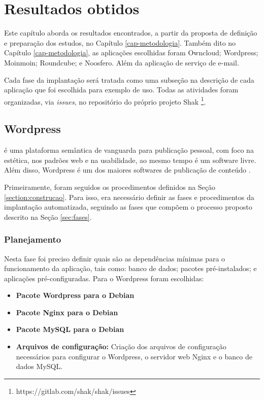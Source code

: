 \chapter{Resultados obtidos}
\label{cap-resultados}
Este capítulo aborda os resultados encontrados, a partir da proposta de
definição e preparação dos estudos, no Capítulo \ref{cap-metodologia}. Também dito 
no Capítulo \ref{cap-metodologia}, as aplicações escolhidas foram  
Owncloud; Wordpress; Moinmoin; Roundcube; e Noosfero. Além da aplicação de serviço
de e-mail.
 
Cada fase da implantação será tratada como uma 
subseção na descrição de cada aplicação que foi escolhida para exemplo de uso. 
Todas as atividades foram organizadas,
via \textit{issues}, no repositório do próprio projeto Shak 
\footnote{https://gitlab.com/shak/shak/issues}.

\section{Wordpress}
\label{sub:wordpress}

 é uma plataforma semântica de vanguarda para publicação pessoal, 
com foco na estética, nos padrões web e na usabilidade, ao mesmo tempo é 
um software livre. Além disso, Wordpress é um dos maiores softwares de 
publicação de conteúdo . 

Primeiramente, foram seguidos os procedimentos definidos na Seção 
\ref{section:construcao}. Para isso, era
necessário definir as fases e procedimentos da implantação automatizada,
seguindo as fases que compõem o processo proposto descrito na Seção \ref{sec:fases}.

\subsection{Planejamento}

Nesta fase foi preciso definir quais são as dependências mínimas
para o funcionamento da aplicação, tais como: banco de dados; pacotes
pré-instalados; e aplicações pré-configuradas. Para o Wordpress foram escolhidas:

\begin{itemize}
   \item \textbf{Pacote Wordpress para o Debian} 
   \item \textbf{Pacote Nginx para o Debian} 
   \item \textbf{Pacote MySQL para o Debian}
   \item \textbf{Arquivos de configuração:} Criação dos arquivos de configuração
   necessários para configurar o Wordpress, o servidor web Nginx e o banco de dados
   MySQL.
\end{itemize}

